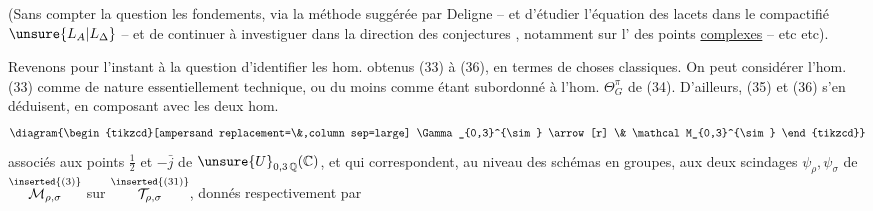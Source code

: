 (Sans compter la question  les fondements, via la méthode suggérée par Deligne -- et d'étudier l'équation des lacets dans le compactifié  $\unsure{L_A|L_\Delta}$ -- et de continuer à investiguer dans la direction des conjectures , notamment sur l' des points \uline{complexes} -- etc etc).



Revenons pour l'instant à la question d'identifier les  hom. obtenus (33) à (36), en termes de choses classiques. On peut considérer l'hom. (33)  comme de nature essentiellement technique, ou du moins comme étant subordonné à l'hom. $\Theta_G^\pi$ de (34). D'ailleurs, (35) et (36) s'en déduisent, en  composant avec les deux hom.
\[
\diagram{\begin{tikzcd}[ampersand replacement=\&,column sep=large]
\Gamma_{0,3}^{\sim} \arrow[r] \& \mathcal M_{0,3}^{\sim}
\end{tikzcd}}
\]
 associés aux  points $\frac12$ et $-\bar j$ de $\unsure{U}_{0,3\,\mathbb Q}(\mathbb C)$, et qui correspondent, au niveau des schémas en groupes, aux deux scindages $\psi_\rho,\psi_\sigma$ de $\overset{\inserted{(3)}}{\mathcal M_{\rho,\sigma}}$ sur $\overset{\inserted{(31)}}{\mathcal T_{\rho,\sigma}}$, donnés  respectivement par
